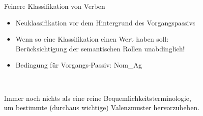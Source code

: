 \begin{frame}
  {Feinere Klassifikation von Verben}
  \onslide<+->
  \begin{itemize}[<+->]
    \item Neuklassifikation vor dem Hintergrund des Vorgangspassivs
    \item Wenn so eine Klassifikation einen Wert haben soll:\\
      \alert{Berücksichtigung der semantischen Rollen unabdinglich!}
    \item Bedingung für Vorgangs-Passiv: \alert{Nom\_Ag}
  \end{itemize} 
  \onslide<+-> 
  \Zeile
  \centering
  \\
  \raggedright
  \Zeile
  \onslide<+->
  Immer noch nichts als eine reine Bequemlichkeitsterminologie,\\
  um bestimmte (durchaus wichtige) Valenzmuster hervorzuheben.
\end{frame}


